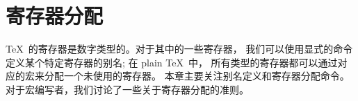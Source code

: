\documentclass{book}
\begin{document}
\chapter{寄存器分配}\label{alloc}

\TeX\ 的寄存器是数字类型的。对于其中的一些寄存器，
我们可以使用显式的命令定义某个特定寄存器的别名;
在 plain \TeX\ 中，
所有类型的寄存器都可以通过对应的宏来分配一个未使用的寄存器。
本章主要关注别名定义和寄存器分配命令。
对于宏编写者，我们讨论了一些关于寄存器分配的准则。
\end{document}
